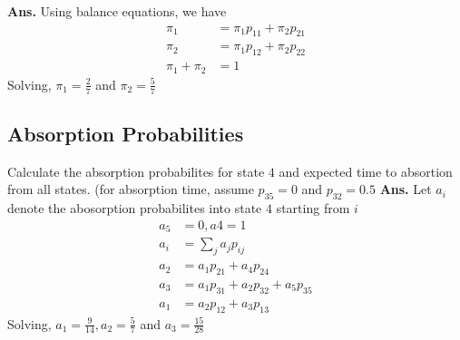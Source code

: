 \documentclass[11pt, a4paper]{article}
\begin{document}
    \textbf{Ans.} Using balance equations, we have
    \begin{align*}
        \pi_{1} &= \pi_{1}p_{11} + \pi_{2}p_{21}\\
        \pi_{2} &= \pi_{1}p_{12} + \pi_{2}p_{22}\\
        \pi_{1} + \pi_{2} &= 1
    \end{align*}
    Solving, $\pi_{1} = \frac{2}{7}$ and $\pi_{2} = \frac{5}{7}$
    
    \subsection{Absorption Probabilities}
    \begin{center}
    \end{center}    
    Calculate the absorption probabilites for state $4$ and expected time to absortion from all states. (for absorption time, assume $p_{35} = 0$ and $p_{32} = 0.5$\newline \newline
    \textbf{Ans.} Let $a_{i}$ denote the abosorption probabilites into state $4$ starting from $i$
    \begin{align*}
        a_{5} &= 0, a{4} = 1 \\
        a_{i} &= \sum_{j} a_{j}p_{ij}\\
        a_{2} &= a_{1}p_{21} + a_{4}p_{24}\\
        a_{3} &= a_{1}p_{31} + a_{2}p_{32} + a_{5}p_{35}\\
        a_{1} &= a_{2}p_{12} + a_{3}p_{13}
    \end{align*}
    Solving, $a_{1} = \frac{9}{14}, a_{2} = \frac{5}{7}$ and $a_{3} = \frac{15}{28}$ \newline
    
\end{document}
